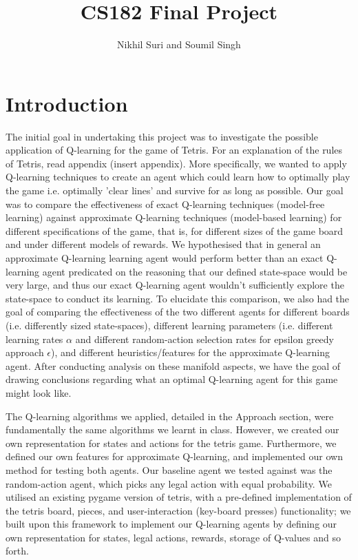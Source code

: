\documentclass[11pt]{article}
\title{CS182 Final Project}
\author{Nikhil Suri and Soumil Singh}
\begin{document}
\maketitle{}


\section{Introduction}
The initial goal in undertaking this project was to investigate the possible application of Q-learning for the game of Tetris. For an explanation of the rules of Tetris, read appendix (insert appendix). More specifically, we wanted to apply Q-learning techniques to create an agent which could learn how to optimally play the game i.e. optimally 'clear lines' and survive for as long as possible. Our goal was to compare the effectiveness of exact Q-learning techniques (model-free learning) against approximate Q-learning techniques (model-based learning) for different specifications of the game, that is, for different sizes of the game board and under different models of rewards. We hypothesised that in general an approximate Q-learning learning agent would perform better than an exact Q-learning agent predicated on the reasoning that our defined state-space would be very large, and thus our exact Q-learning agent wouldn't sufficiently explore the state-space to conduct its learning. To elucidate this comparison, we also had the goal of comparing the effectiveness of the two different agents for different boards (i.e. differently sized state-spaces), different learning parameters (i.e. different learning rates $\alpha$ and different random-action selection rates for epsilon greedy approach $\epsilon$), and different heuristics/features for the approximate Q-learning agent. After conducting analysis on these manifold aspects, we have the goal of drawing conclusions regarding what an optimal Q-learning agent for this game might look like.

The Q-learning algorithms we applied, detailed in the Approach section, were fundamentally the same algorithms we learnt in class. However, we created our own representation for states and actions for the tetris game. Furthermore, we defined our own features for approximate Q-learning, and implemented our own method for testing both agents. Our baseline agent we tested against was the random-action agent, which picks any legal action with equal probability. We utilised an existing pygame version of tetris, with a pre-defined implementation of the tetris board, pieces, and user-interaction (key-board presses) functionality; we built upon this framework to implement our Q-learning agents by defining our own representation for states, legal actions, rewards, storage of Q-values and so forth.
\end{document}
